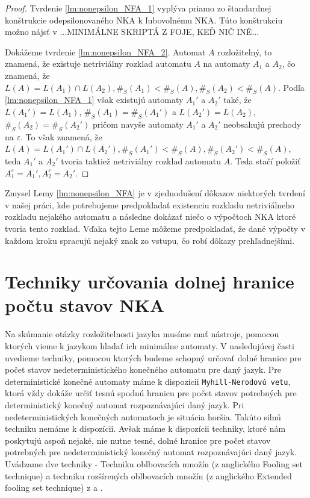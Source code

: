\begin{proof}
Tvrdenie \ref{lm:nonepsilon_NFA_1} vyplýva priamo zo štandardnej konštrukcie odepsilonovaného NKA k ľubovoľnému NKA. Túto konštrukciu možno nájsť v ...MINIMÁLNE SKRIPTÁ Z FOJE, KEĎ NIČ INĚ... 
\par
Dokážeme tvrdenie \ref{lm:nonepsilon_NFA_2}. Automat $ A $ rozložitelný, to znamená, že existuje netriviálny rozklad automatu $ A $ na automaty $ A_1 $ a $ A_2 $, čo znamená, že $ L(A) = L(A_1) \cap L(A_2), \#_S(A_1) < \#_S(A), \#_S(A_2) < \#_S(A) $. Podľa \ref{lm:nonepsilon_NFA_1} však existujú automaty $ A_1' $ a $ A_2' $ také, že $ L(A_1')=L(A_1) $, $ \#_S(A_1)=\#_S(A_1') $ a $ L(A_2')=L(A_2) $, $ \#_S(A_2)=\#_S(A_2') $ pričom navyše automaty $ A_1' $ a $ A_2' $ neobsahujú prechody na $ \varepsilon $. To však znamená, že $ L(A) = L(A_1') \cap L(A_2'), \#_S(A_1') < \#_S(A), \#_S(A_2') < \#_S(A) $, teda $ A_1' $ a $ A_2' $ tvoria taktiež netriviálny rozklad automatu $ A $. Teda stačí položiť $ A_1^{\varepsilon} = A_1', A_2^{\varepsilon} = A_2'$.
\end{proof}

\begin{note}
Zmysel Lemy \ref{lm:nonepsilon_NFA} je v zjednodušení dôkazov niektorých tvrdení v našej práci, kde potrebujeme predpokladať existenciu rozkladu netriviálneho rozkladu nejakého automatu a následne dokázať niečo o výpočtoch NKA ktoré tvoria tento rozklad. Vďaka tejto Leme môžeme predpokladať, že dané výpočty v každom kroku spracujú nejaký znak zo vstupu, čo robí dôkazy prehľadnejšími.
\end{note}

\section{Techniky určovania dolnej hranice počtu stavov NKA}

Na skúmanie otázky rozložitelnosti jazyka musíme mať nástroje, pomocou ktorých vieme k jazykom hladať ich minimálne automaty. V nasledujúcej časti uvedieme techniky, pomocou ktorých budeme schopný určovať dolné hranice pre počet stavov nedeterministického konečného automatu pre daný jazyk. Pre deterministické konečné automaty máme k dispozícii \verb'Myhill-Nerodovú vetu', ktorá vždy dokáže určiť tesnú spodnú hranicu pre počet stavov potrebných pre deterministický konečný automat rozpoznávajúci daný jazyk. Pri nedeterministických konečných automatoch je situácia horšia. Takúto silnú techniku nemáme k dispozícii. Avšak máme k dispozícii techniky, ktoré nám poskytujú aspoň nejaké, nie nutne tesné, dolné hranice pre počet stavov potrebných pre nedeterministický konečný automat rozpoznávajúci daný jazyk. Uvádzame dve techniky - Techniku oblbovacích množín (z anglického Fooling set technique) a techniku rozšírených oblbovacích množín (z anglického Extended fooling set technique) z \cite{Palioudakis2012} a \cite{GlaisterShalit1996}.


